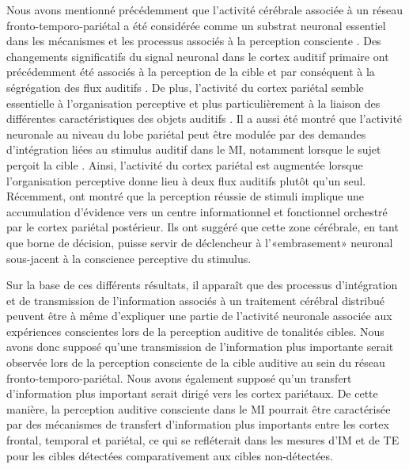 Nous avons mentionné précédemment que l'activité cérébrale associée à un réseau fronto-temporo-pariétal a été considérée comme un substrat neuronal essentiel dans les mécanismes et les processus associés à la perception consciente \citep{demertzi2013consciousness, eriksson2007similar, giani2015detecting}. 
Des changements significatifs du signal neuronal dans le cortex auditif primaire ont précédemment été associés à la perception de la cible et par conséquent à la ségrégation des flux auditifs \citep{kondo2009involvement}. 
De plus, l'activité du cortex pariétal semble essentielle à l'organisation perceptive et plus particulièrement à la liaison des différentes caractéristiques des objets auditifs \citep{cusack2005intraparietal}. 
Il a aussi été montré que l'activité neuronale au niveau du lobe pariétal peut être modulée par des demandes d'intégration liées au stimulus auditif dans le MI, notamment lorsque le sujet perçoit la cible \citep{eriksson2017activity}. 
Ainsi, l'activité du cortex pariétal est augmentée lorsque l'organisation perceptive donne lieu à deux flux auditifs plutôt qu'un seul. 
Récemment, \cite{pereira2021evidence} ont montré que la perception réussie de stimuli implique une accumulation d'évidence vers un centre informationnel et fonctionnel orchestré par le cortex pariétal postérieur. 
Ils ont suggéré que cette zone cérébrale, en tant que borne de décision, puisse servir de déclencheur à l'«embrasement» neuronal sous-jacent à la conscience perceptive du stimulus. 

Sur la base de ces différents résultats, il apparaît que des processus d'intégration et de transmission de l'information associés à un traitement cérébral distribué peuvent être à même d'expliquer une partie de l'activité neuronale associée aux expériences conscientes lors de la perception auditive de tonalités cibles. 
Nous avons donc supposé qu'une transmission de l'information plus importante serait observée lors de la perception consciente de la cible auditive au sein du réseau fronto-temporo-pariétal. 
Nous avons également supposé qu'un transfert d'information plus important serait dirigé vers les cortex pariétaux. 
De cette manière, la perception auditive consciente dans le MI pourrait être caractérisée par des mécanismes de transfert d'information plus importants entre les cortex frontal, temporal et pariétal, ce qui se refléterait dans les mesures d'IM et de TE pour les cibles détectées comparativement aux cibles non-détectées. 

